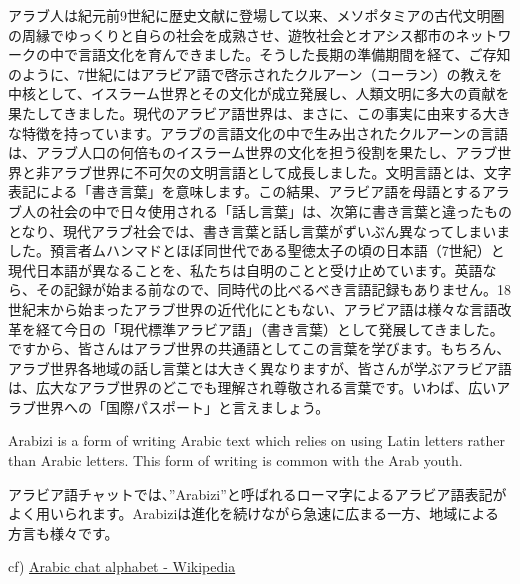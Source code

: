 アラブ人は紀元前9世紀に歴史文献に登場して以来、メソポタミアの古代文明圏の周縁でゆっくりと自らの社会を成熟させ、遊牧社会とオアシス都市のネットワークの中で言語文化を育んできました。そうした長期の準備期間を経て、ご存知のように、7世紀にはアラビア語で啓示されたクルアーン（コーラン）の教えを中核として、イスラーム世界とその文化が成立発展し、人類文明に多大の貢献を果たしてきました。現代のアラビア語世界は、まさに、この事実に由来する大きな特徴を持っています。アラブの言語文化の中で生み出されたクルアーンの言語は、アラブ人口の何倍ものイスラーム世界の文化を担う役割を果たし、アラブ世界と非アラブ世界に不可欠の文明言語として成長しました。文明言語とは、文字表記による「書き言葉」を意味します。この結果、アラビア語を母語とするアラブ人の社会の中で日々使用される「話し言葉」は、次第に書き言葉と違ったものとなり、現代アラブ社会では、書き言葉と話し言葉がずいぶん異なってしまいました。預言者ムハンマドとほぼ同世代である聖徳太子の頃の日本語（7世紀）と現代日本語が異なることを、私たちは自明のことと受け止めています。英語なら、その記録が始まる前なので、同時代の比べるべき言語記録もありません。18世紀末から始まったアラブ世界の近代化にともない、アラビア語は様々な言語改革を経て今日の「現代標準アラビア語」（書き言葉）として発展してきました。ですから、皆さんはアラブ世界の共通語としてこの言葉を学びます。もちろん、アラブ世界各地域の話し言葉とは大きく異なりますが、皆さんが学ぶアラビア語は、広大なアラブ世界のどこでも理解され尊敬される言葉です。いわば、広いアラブ世界への「国際パスポート」と言えましょう\cite{el.minoh.osaka-u.ac.jp/flc/ara/culture01.html}。

Arabizi is a form of writing Arabic text which relies on using Latin letters rather than Arabic letters. This form of writing is common with the Arab youth\cite{sentiment_analysis_for_arabizi_text}.

アラビア語チャットでは、”Arabizi”と呼ばれるローマ字によるアラビア語表記がよく用いられます。Arabiziは進化を続けながら急速に広まる一方、地域による方言も様々です\cite{www.basistech.jp/rosette-api-adds-support-for-arabizi-script/}。

cf) \href{https://en.wikipedia.org/wiki/Arabic_chat_alphabet}{Arabic chat alphabet - Wikipedia}
